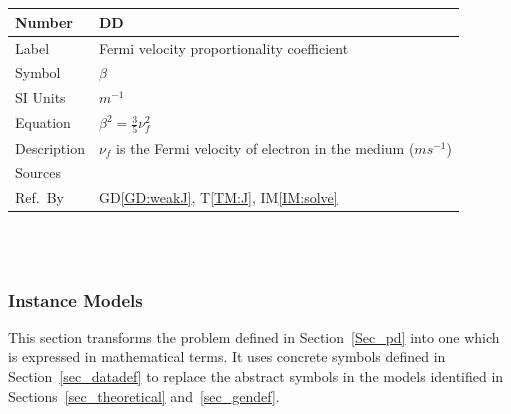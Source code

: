 \documentclass[12pt]{article}
\newcommand{\colBwidth}{0.82\textwidth} \newcommand{\colCwidth}{0.1\textwidth}
\newcounter{defnum} %
\newcounter{datadefnum} %
\begin{document}
	~\newline
	
	
	~\newline
	
	\noindent \begin{minipage}{\textwidth} \renewcommand*{\arraystretch}{1.5}
		\begin{tabular}{| p{\colAwidth} | p{\colBwidth}|} \hline \rowcolor[gray]{0.9}
			Number& DD{datadefnum}\thedatadefnum \label{DD:beta}\\ \hline
			Label& Fermi velocity proportionality coefficient \\ \hline Symbol &$\beta$\\
			\hline %
			SI Units & $m^{-1}$\\ \hline Equation&$\beta^2 = \frac{3}{5} \nu_f^2$\\ \hline
			Description & $\nu_f$ is the Fermi velocity of electron in the medium
			($ms^{-1}$) \\ \hline Sources& \cite{hiremath2012numerical} \\ \hline Ref.\ By
			& GD\ref{GD:weakJ}, T\ref{TM:J}, IM\ref{IM:solve} \\ \hline \end{tabular}
	\end{minipage}\\
	
	~\newline
	
	
	
	
	\subsubsection{Instance Models} \label{sec_instance}
	
	This section transforms the problem defined in Section~\ref{Sec_pd} into one
	which is expressed in mathematical terms. It uses concrete symbols defined in
	Section~\ref{sec_datadef} to replace the abstract symbols in the models
	identified in Sections~\ref{sec_theoretical} and~\ref{sec_gendef}.
	
	
	
	
	
\end{document}

